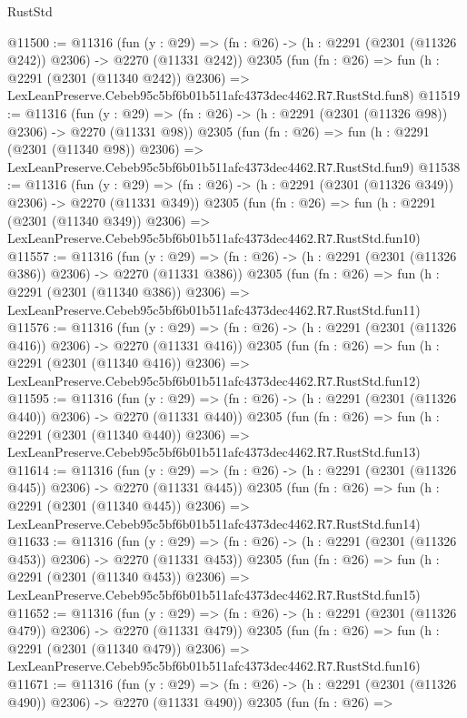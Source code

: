 \begin{lexlean}{RustStd}
\begin{coremodule}
@11500 := @11316
    (fun (y : @29) => (fn : @26) -> (h : @2291 (@2301 (@11326 @242)) @2306) -> @2270 (@11331 @242))
    @2305
    (fun (fn : @26) =>
    fun (h : @2291 (@2301 (@11340 @242)) @2306) =>
    LexLeanPreserve.Cebeb95c5bf6b01b511afc4373dec4462.R7.RustStd.fun8)
@11519 := @11316
    (fun (y : @29) => (fn : @26) -> (h : @2291 (@2301 (@11326 @98)) @2306) -> @2270 (@11331 @98))
    @2305
    (fun (fn : @26) =>
    fun (h : @2291 (@2301 (@11340 @98)) @2306) =>
    LexLeanPreserve.Cebeb95c5bf6b01b511afc4373dec4462.R7.RustStd.fun9)
@11538 := @11316
    (fun (y : @29) => (fn : @26) -> (h : @2291 (@2301 (@11326 @349)) @2306) -> @2270 (@11331 @349))
    @2305
    (fun (fn : @26) =>
    fun (h : @2291 (@2301 (@11340 @349)) @2306) =>
    LexLeanPreserve.Cebeb95c5bf6b01b511afc4373dec4462.R7.RustStd.fun10)
@11557 := @11316
    (fun (y : @29) => (fn : @26) -> (h : @2291 (@2301 (@11326 @386)) @2306) -> @2270 (@11331 @386))
    @2305
    (fun (fn : @26) =>
    fun (h : @2291 (@2301 (@11340 @386)) @2306) =>
    LexLeanPreserve.Cebeb95c5bf6b01b511afc4373dec4462.R7.RustStd.fun11)
@11576 := @11316
    (fun (y : @29) => (fn : @26) -> (h : @2291 (@2301 (@11326 @416)) @2306) -> @2270 (@11331 @416))
    @2305
    (fun (fn : @26) =>
    fun (h : @2291 (@2301 (@11340 @416)) @2306) =>
    LexLeanPreserve.Cebeb95c5bf6b01b511afc4373dec4462.R7.RustStd.fun12)
@11595 := @11316
    (fun (y : @29) => (fn : @26) -> (h : @2291 (@2301 (@11326 @440)) @2306) -> @2270 (@11331 @440))
    @2305
    (fun (fn : @26) =>
    fun (h : @2291 (@2301 (@11340 @440)) @2306) =>
    LexLeanPreserve.Cebeb95c5bf6b01b511afc4373dec4462.R7.RustStd.fun13)
@11614 := @11316
    (fun (y : @29) => (fn : @26) -> (h : @2291 (@2301 (@11326 @445)) @2306) -> @2270 (@11331 @445))
    @2305
    (fun (fn : @26) =>
    fun (h : @2291 (@2301 (@11340 @445)) @2306) =>
    LexLeanPreserve.Cebeb95c5bf6b01b511afc4373dec4462.R7.RustStd.fun14)
@11633 := @11316
    (fun (y : @29) => (fn : @26) -> (h : @2291 (@2301 (@11326 @453)) @2306) -> @2270 (@11331 @453))
    @2305
    (fun (fn : @26) =>
    fun (h : @2291 (@2301 (@11340 @453)) @2306) =>
    LexLeanPreserve.Cebeb95c5bf6b01b511afc4373dec4462.R7.RustStd.fun15)
@11652 := @11316
    (fun (y : @29) => (fn : @26) -> (h : @2291 (@2301 (@11326 @479)) @2306) -> @2270 (@11331 @479))
    @2305
    (fun (fn : @26) =>
    fun (h : @2291 (@2301 (@11340 @479)) @2306) =>
    LexLeanPreserve.Cebeb95c5bf6b01b511afc4373dec4462.R7.RustStd.fun16)
@11671 := @11316
    (fun (y : @29) => (fn : @26) -> (h : @2291 (@2301 (@11326 @490)) @2306) -> @2270 (@11331 @490))
    @2305
    (fun (fn : @26) =>

\end{coremodule}
\end{lexlean}
